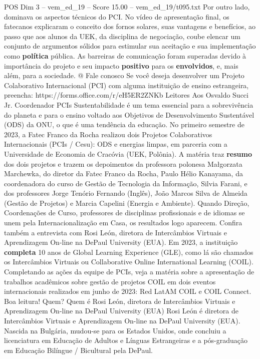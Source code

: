 \begin{textsample}{POS Dim 3 – vem\_ed\_19 – Score 15.00 – vem\_ed\_19/t095.txt}
Por outro lado, dominava os aspectos técnicos do PCI.
No vídeo de apresentação final, os fatecanos explicaram o conceito dos fornos solares, suas vantagens e benefícios, ao passo que aos alunos da UEK, da disciplina de negociação, coube elencar um conjunto de argumentos sólidos para estimular sua aceitação e sua implementação como \textbf{política} pública.
As barreiras de comunicação foram superadas devido à importância do projeto e seu impacto \textbf{positivo} para os \textbf{envolvidos}, e, mais além, para a sociedade. @ Fale conosco Se você deseja desenvolver um Projeto Colaborativo Internacional (PCI) com alguma instituição de ensino estrangeira, preencha: https://forms.office.com/r/eH5ER2ZNKb Leitores Aos Osvaldo Succi Jr.
Coordenador PCIs Sustentabilidade é um tema essencial para a sobrevivência do planeta e para o ensino voltado aos Objetivos de Desenvolvimento Sustentável (ODS) da ONU, o que é uma tendência da educação.
No primeiro semestre de 2023, a Fatec Franco da Rocha realizou dois Projetos Colaborativos Internacionais (PCIs / Cesu): ODS e energias limpas, em parceria com a Universidade de Economia de Cracóvia (UEK, Polônia).
A matéria traz \textbf{resumo} dos dois projetos e trazem os depoimentos da professora polonesa Małgorzata Marchewka, do diretor da Fatec Franco da Rocha, Paulo Hélio Kanayama, da coordenadora do curso de Gestão de Tecnologia da Informação, Silvia Farani, e dos professores Jorge Tenório Fernando (Inglês), João Marcos Silva de Almeida (Gestão de Projetos) e Marcia Capelini (Energia e Ambiente).
Quando Direção, Coordenações de Curso, professores de disciplinas profissionais e de idiomas se unem pela Internacionalização em Casa, os resultados logo aparecem.
Confira também a entrevista com Rosi León, diretora de Intercâmbios Virtuais e Aprendizagem On-line na DePaul University (EUA).
Em 2023, a instituição \textbf{completa} 10 anos de Global Learning Experience (GLE), como lá são chamados os Intercâmbios Virtuais ou Collaborative Online International Learning (COIL).
Completando as ações da equipe de PCIs, veja a matéria sobre a apresentação de trabalhos acadêmicos sobre gestão de projetos COIL em dois eventos internacionais realizados em junho de 2023: Red LatAM COIL e COIL Connect.
Boa leitura!
Quem?
Quem é Rosi León, diretora de Intercâmbios Virtuais e Aprendizagem On-line na DePaul University (EUA) Rosi León é diretora de Intercâmbios Virtuais e Aprendizagem On-line na DePaul University (EUA).
Nascida na Bulgária, mudou-se para os Estados Unidos, onde concluiu a licenciatura em Educação de Adultos e Línguas Estrangeiras e a pós-graduação em Educação Bilíngue / Bicultural pela DePaul.

\end{textsample}

